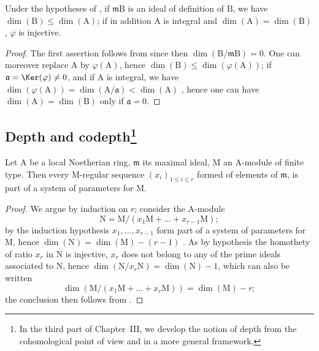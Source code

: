 \begin{corollary}[16.3.10]
\label{0.16.3.10}
Under the hypotheses of , if $\mathfrak{m}\mathrm{B}$ is an ideal of definition of $\mathrm{B}$, we have $\dim(\mathrm{B})\leq\dim(\mathrm{A})$; if in addition $\mathrm{A}$ is integral and $\dim(\mathrm{A})=\dim(\mathrm{B})$, $\varphi$ is injective.
\end{corollary}

\begin{proof}
The first assertion follows from  since then $\dim(\mathrm{B}/\mathfrak{m}\mathrm{B})=0$.
One can moreover replace $\mathrm{A}$ by $\varphi(\mathrm{A})$, hence $\dim(\mathrm{B})\leq\dim(\varphi(\mathrm{A}))$; if $\mathfrak{a}=\Ker(\varphi)\neq 0$, and if $\mathrm{A}$ is integral, we have $\dim(\varphi(\mathrm{A}))=\dim(\mathrm{A}/\mathfrak{a})<\dim(\mathrm{A})$ , hence one can have $\dim(\mathrm{A})=\dim(\mathrm{B})$ only if $\mathfrak{a}=0$.
\end{proof}

\subsection[Depth and codepth]{Depth and
codepth\protect\footnote{In the third part of Chapter~III, we develop the
notion of depth from the cohomological point of view and in a more general
framework.}}
\label{subsection:0.16.4}

\begin{proposition}[16.4.1]
\label{0.16.4.1}
Let $\mathrm{A}$ be a local Noetherian ring, $\mathfrak{m}$ its maximal ideal, $\mathrm{M}$ an $\mathrm{A}$-module of finite type.
Then every $\mathrm{M}$-regular sequence $(x_i)_{1\leq i\leq r}$  formed of elements of $\mathfrak{m}$, is part of a system of parameters for $\mathrm{M}$.
\end{proposition}

\begin{proof}
We argue by induction on $r$; consider the $\mathrm{A}$-module
\[
  \mathrm{N}=\mathrm{M}/(x_1\mathrm{M}+\ldots+x_{r-1}\mathrm{M});
\]
by the induction hypothesis $x_1,\ldots,x_{r-1}$ form part of a system of parameters for $\mathrm{M}$, hence $\dim(\mathrm{N})=\dim(\mathrm{M})-(r-1)$ .
As by hypothesis the homothety of ratio $x_r$ in $\mathrm{N}$ is injective, $x_r$ does not belong to any of the prime ideals associated to $\mathrm{N}$, hence  $\dim(\mathrm{N}/x_r\mathrm{N})=\dim(\mathrm{N})-1$, which can also be written
\[
  \dim(\mathrm{M}/(x_1\mathrm{M}+\ldots+x_r\mathrm{M}))=\dim(\mathrm{M})-r;
\]
the conclusion then follows from .
\end{proof}

